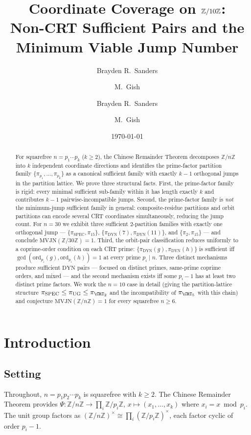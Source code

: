 \documentclass[11pt,reqno]{amsart}
\title[Coordinate coverage on $\Z/10\Z$]{Coordinate Coverage on $\Z/10\Z$:\\
Non-CRT Sufficient Pairs and the Minimum Viable Jump Number}
\author{Brayden R.\ Sanders \and M.\ Gish}
\author{Brayden R.\ Sanders \and M.\ Gish}
\date{\today}
\theoremstyle{plain}
\theoremstyle{definition}
\newcommand{\Z}{\mathbb{Z}}
\newcommand{\Zn}{\Z/n\Z}
\newcommand{\Zns}{(\Z/n\Z)^{\times}}
\newcommand{\DYN}{\mathrm{DYN}}
\newcommand{\SPEC}{\mathrm{SPEC}}
\newcommand{\UG}{\mathrm{UG}}
\newcommand{\ord}{\mathrm{ord}}
\begin{document}
\begin{abstract}
For squarefree $n = p_1 \cdots p_k$ ($k \geq 2$), the Chinese Remainder Theorem decomposes $\Zn$ into $k$ independent coordinate directions and identifies the prime-factor partition family $\{\pi_{p_1},\ldots,\pi_{p_k}\}$ as a canonical sufficient family with exactly $k-1$ orthogonal jumps in the partition lattice. We prove three structural facts. First, the prime-factor family is rigid: every minimal sufficient sub-family within it has length exactly $k$ and contributes $k-1$ pairwise-incompatible jumps. Second, the prime-factor family is \emph{not} the minimum-jump sufficient family in general: composite-residue partitions and orbit partitions can encode several CRT coordinates simultaneously, reducing the jump count. For $n = 30$ we exhibit three sufficient $2$-partition families with exactly one orthogonal jump --- $\{\pi_{\SPEC}, \pi_{15}\}$, $\{\pi_{\DYN}(7), \pi_{\DYN}(11)\}$, and $\{\pi_2, \pi_{15}\}$ --- and conclude $\mathrm{MVJN}(\Z/30\Z) = 1$. Third, the orbit-pair classification reduces uniformly to a coprime-order condition on each CRT prime: $\{\pi_{\DYN}(g), \pi_{\DYN}(h)\}$ is sufficient iff $\gcd(\ord_{p_i}(g), \ord_{p_i}(h)) = 1$ at every prime $p_i \mid n$. Three distinct mechanisms produce sufficient $\DYN$ pairs --- focused on distinct primes, same-prime coprime orders, and mixed --- and the second mechanism exists iff some $p_i - 1$ has at least two distinct prime factors. We work the $n = 10$ case in detail (giving the partition-lattice structure $\pi_{\SPEC} \leq \pi_{\UG} \leq \pi_{\CRT_2}$ and the incompatibility of $\pi_{\CRT_5}$ with this chain) and conjecture $\mathrm{MVJN}(\Zn) = 1$ for every squarefree $n \geq 6$.
\end{abstract}

\maketitle

\section{Introduction}

\subsection{Setting}

Throughout, $n = p_1 p_2 \cdots p_k$ is squarefree with $k \geq 2$. The Chinese Remainder Theorem provides $\Psi \colon \Zn \to \prod_i \Z/p_i\Z$, $x \mapsto (x_1,\ldots,x_k)$ where $x_i = x \bmod p_i$. The unit group factors as $\Zns \cong \prod_i (\Z/p_i\Z)^{\times}$, each factor cyclic of order $p_i - 1$.
\end{document}
